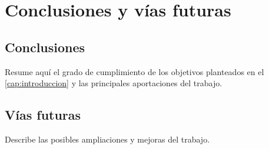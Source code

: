 
\chapter{Conclusiones y vías futuras}
\label{cap:conclusiones}

\section{Conclusiones}

Resume aquí el grado de cumplimiento de los objetivos planteados en el \cref{cap:introduccion} y las principales aportaciones del trabajo.

\section{Vías futuras}

Describe las posibles ampliaciones y mejoras del trabajo.
